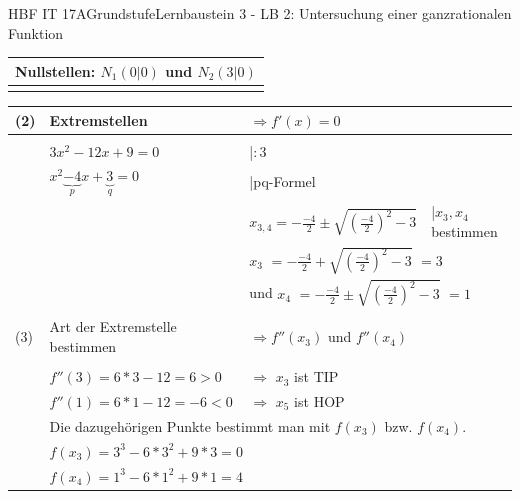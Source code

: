 \documentclass[oneside,openany,headings=optiontotoc,11pt,numbers=noenddot]{scrreprt}
\begin{document}
\begin{worksheet}{HBF IT 17A}{Grundstufe}{Lernbaustein 3 - LB 2: Untersuchung einer ganzrationalen Funktion}
\begin{framed}
\begin{tabularx}{\textwidth}{lXXl}
				\multicolumn{4}{l}{Nullstellen: \colorbox{blue!5}{\(N_1(0|0)\)} und \colorbox{blue!5}{\(N_2(3|0)\)}}\\
				\hline\hline\\
			\end{tabularx}
			\begin{tabularx}{\textwidth}{lXXl}
				(2) & Extremstellen & \(\Rightarrow f'(x) = 0\)\\
				\hline\\
				& \(3x^2 -12x+9 = 0\) & |\(:3\)\\
				& \(x^2 \underbrace{-4}_{p}x +\underbrace{3}_{q} = 0\) & |pq-Formel\\
				& & \(x_{3,4} = -\frac{-4}{2} \pm \sqrt{\left(\frac{-4}{2}\right)^2 -3}\) & |\(x_3,x_4\) bestimmen\\
				& & \multicolumn{2}{l}{\colorbox{green!10}{\(x_3\)} \(= -\frac{-4}{2} + \sqrt{\left(\frac{-4}{2}\right)^2 -3}\) \colorbox{green!10}{\(= 3\)}}\\
				& & \multicolumn{2}{l}{und \colorbox{green!10}{\(x_4\)} \(= -\frac{-4}{2} \pm \sqrt{\left(\frac{-4}{2}\right)^2 -3}\) \colorbox{green!10}{\(= 1\)}}\\
				\\
				(3) & Art der Extremstelle bestimmen & \(\Rightarrow f''(x_3)\) und \(f''(x_4)\)\\
				\hline\\				 
				& \(f''(3) =  6*3 -12 = 6 > 0\) & \(\Rightarrow\) \colorbox{green!10}{\(x_3\) ist TIP}\\
				& \(f''(1) = 6*1 -12 = -6 < 0\) & \(\Rightarrow\) \colorbox{green!10}{\(x_5\) ist HOP}\\
				& \multicolumn{3}{l}{Die dazugehörigen Punkte bestimmt man mit \(f(x_3)\) bzw. \(f(x_4)\).}\\
				& \multicolumn{2}{l}{\(f(x_3) = 3^3 -6*3^2 +9*3 = 0\)}\\
				& \multicolumn{2}{l}{\(f(x_4) = 1^3 -6*1^2 +9*1 = 4\)}\\
				

\end{tabularx}
\end{framed}
\end{worksheet}
\end{document}
